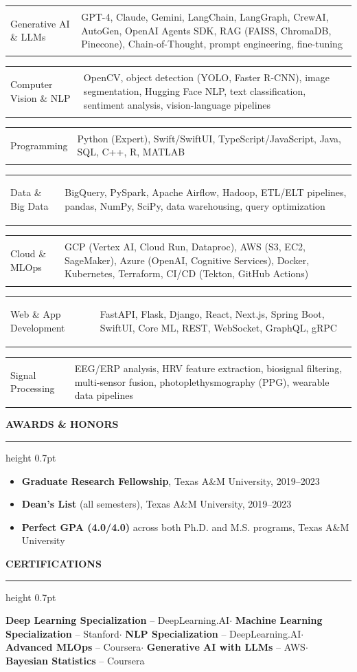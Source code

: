 \documentclass[11pt,letterpaper]{article}
\makeatletter
\newcommand{\cvsection}[1]{%
  \vspace{0.7em}%
  {\color{headerblue}\large\bfseries\MakeUppercase{#1}}%
  \vspace{0.12em}%
  {\color{rulecolor}\hrule height 0.7pt}%
  \vspace{0.35em}%
}
\newcommand{\cvskillrow}[2]{%
  \noindent\begin{tabularx}{\textwidth}{@{}>{\color{headerblue}\bfseries\raggedright}p{4.2cm} X@{}}
    #1 & {\color{darktext}#2}\\
  \end{tabularx}\vspace{0.08em}%
}
\makeatother
\begin{document}
\cvskillrow{Generative AI \& LLMs}{GPT-4, Claude, Gemini, LangChain, LangGraph, CrewAI, AutoGen, OpenAI Agents SDK, RAG (FAISS, ChromaDB, Pinecone), Chain-of-Thought, prompt engineering, fine-tuning}

\cvskillrow{Computer Vision \& NLP}{OpenCV, object detection (YOLO, Faster R-CNN), image segmentation, Hugging Face NLP, text classification, sentiment analysis, vision-language pipelines}

\cvskillrow{Programming}{Python (Expert), Swift/SwiftUI, TypeScript/JavaScript, Java, SQL, C++, R, MATLAB}

\cvskillrow{Data \& Big Data}{BigQuery, PySpark, Apache Airflow, Hadoop, ETL/ELT pipelines, pandas, NumPy, SciPy, data warehousing, query optimization}

\cvskillrow{Cloud \& MLOps}{GCP (Vertex AI, Cloud Run, Dataproc), AWS (S3, EC2, SageMaker), Azure (OpenAI, Cognitive Services), Docker, Kubernetes, Terraform, CI/CD (Tekton, GitHub Actions)}

\cvskillrow{Web \& App Development}{FastAPI, Flask, Django, React, Next.js, Spring Boot, SwiftUI, Core ML, REST, WebSocket, GraphQL, gRPC}

\cvskillrow{Signal Processing}{EEG/ERP analysis, HRV feature extraction, biosignal filtering, multi-sensor fusion, photoplethysmography (PPG), wearable data pipelines}

\cvsection{Awards \& Honors}

\begin{itemize}[leftmargin=0.5cm, itemsep=0.05cm, topsep=0.06cm, label={\color{headerblue}\textbullet}]
  \item \textbf{Graduate Research Fellowship}, Texas A\&M University, 2019--2023
  \item \textbf{Dean's List} (all semesters), Texas A\&M University, 2019--2023
  \item \textbf{Perfect GPA (4.0/4.0)} across both Ph.D. and M.S. programs, Texas A\&M University
\end{itemize}

\cvsection{Certifications}

{\small\color{darktext}
\textbf{Deep Learning Specialization} {\color{graytext}-- DeepLearning.AI}\enspace$\cdot$\enspace
\textbf{Machine Learning Specialization} {\color{graytext}-- Stanford}\enspace$\cdot$\enspace
\textbf{NLP Specialization} {\color{graytext}-- DeepLearning.AI}\enspace$\cdot$\enspace
\textbf{Advanced MLOps} {\color{graytext}-- Coursera}\enspace$\cdot$\enspace
\textbf{Generative AI with LLMs} {\color{graytext}-- AWS}\enspace$\cdot$\enspace
\textbf{Bayesian Statistics} {\color{graytext}-- Coursera}
}
\end{document}
